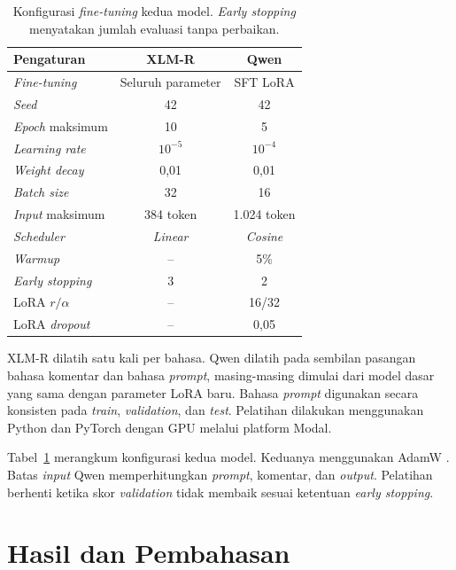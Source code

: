 \documentclass[11pt]{article}
\begin{document}
\begin{table}[t]
\centering\small
\setlength{\tabcolsep}{2.5pt}
\begin{tabular}{lcc}
\toprule
Pengaturan & XLM-R & Qwen \\
\midrule
\textit{Fine-tuning} & Seluruh parameter & SFT LoRA \\
\textit{Seed} & 42 & 42 \\
\textit{Epoch} maksimum & 10 & 5 \\
\textit{Learning rate} & $10^{-5}$ & $10^{-4}$ \\
\textit{Weight decay} & 0,01 & 0,01 \\
\textit{Batch size} & 32 & 16 \\
\textit{Input} maksimum & 384 token & 1.024 token \\
\textit{Scheduler} & \textit{Linear} & \textit{Cosine} \\
\textit{Warmup} & -- & 5\% \\
\textit{Early stopping} & 3 & 2 \\
LoRA $r/\alpha$ & -- & 16/32 \\
LoRA \textit{dropout} & -- & 0,05 \\
\bottomrule
\end{tabular}
\caption{Konfigurasi \textit{fine-tuning} kedua model. \textit{Early stopping} menyatakan jumlah evaluasi tanpa perbaikan.}
\label{tab:configuration}
\end{table}

XLM-R dilatih satu kali per bahasa. Qwen dilatih pada sembilan pasangan bahasa komentar dan bahasa \textit{prompt}, masing-masing dimulai dari model dasar yang sama dengan parameter LoRA baru. Bahasa \textit{prompt} digunakan secara konsisten pada \textit{train}, \textit{validation}, dan \textit{test}. Pelatihan dilakukan menggunakan Python dan PyTorch dengan GPU melalui platform Modal.

Tabel~\ref{tab:configuration} merangkum konfigurasi kedua model. Keduanya menggunakan AdamW \citep{loshchilov-hutter-2019-decoupled}. Batas \textit{input} Qwen memperhitungkan \textit{prompt}, komentar, dan \textit{output}. Pelatihan berhenti ketika skor \textit{validation} tidak membaik sesuai ketentuan \textit{early stopping}.

\section{Hasil dan Pembahasan}
\end{document}
